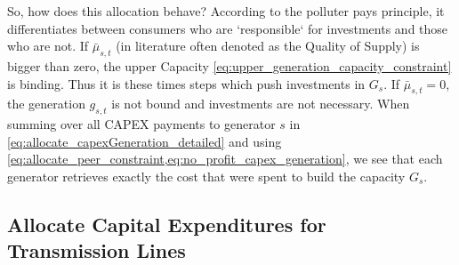 \documentclass[11pt,twocolumn]{article}
\newcommand{\generation}{g_{s,t}}
\newcommand{\capacitygeneration}{G_{s}}
\newcommand{\muuppergeneration}{\bar{\mu}_{s,t}}
\begin{document}
So, how does this allocation behave? According to the polluter pays principle, it differentiates between consumers who are `responsible` for investments and those who are not. If $\muuppergeneration$ (in literature often denoted as the Quality of Supply) is bigger than zero, the upper Capacity \cref{eq:upper_generation_capacity_constraint} is binding. Thus it is these times steps which push investments in $\capacitygeneration$. If $\muuppergeneration = 0$, the generation $\generation$ is not bound and investments are not necessary. 
When summing over all CAPEX payments to generator $s$ in \cref{eq:allocate_capexGeneration_detailed} and using \cref{eq:allocate_peer_constraint,eq:no_profit_capex_generation}, we see that each generator retrieves exactly the cost that were spent to build the capacity $\capacitygeneration$.
 

\subsection{Allocate Capital Expenditures for Transmission Lines}
\end{document}
